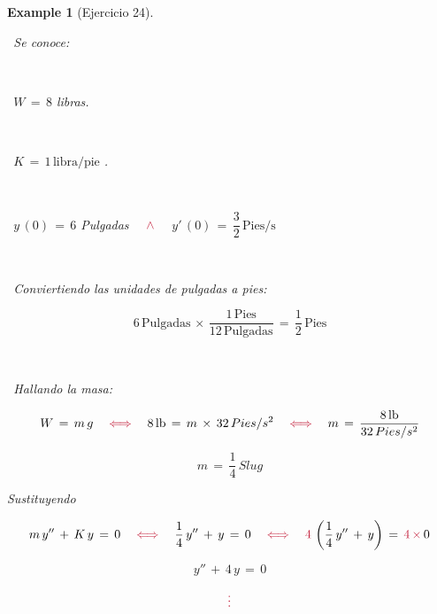 \documentclass[a4paper,11pt,openany]{book}
\newtheorem{exmp}{Example}[section]
\begin{document}
\begin{exmp}[Ejercicio 24]
 
 
\ 
 
\textcolor{cardinal}{}\, Se conoce: 
 
\ 
 
\textcolor{cardinal}{}\, $W\,=\,8$ libras.
 
\ 
 
\textcolor{cardinal}{}\, $K\,=\,1\,\text{libra/pie}$ .
 
\ 
 
\textcolor{cardinal}{}\, $y\,(0)\,=\,6$ Pulgadas $\quad \textcolor{cardinal}{\wedge} \quad$ $y'\,(0)\,=\,\dfrac{3}{2}\,\text{Pies/s}$
 
\ 
 
\textcolor{cardinal}{}\, Conviertiendo las unidades de pulgadas a pies: 
 
$$6\,\text{Pulgadas}\,\times\,\dfrac{1\,\text{Pies}}{12\,\text{Pulgadas}}\,=\,\dfrac{1}{2}\,\text{Pies}$$
 
\ 
 
\textcolor{cardinal}{}\, Hallando la masa: 
 
$$W\,=\,m\,g \quad \textcolor{cardinal}{\iff} \quad 8\,\text{lb}\,=\,m\,\times\,32\,Pies/s^{2} \quad \textcolor{cardinal}{\iff} \quad m\,=\,\dfrac{8\,\text{lb}}{32\,Pies/s^{2} }$$
 
$$\boxed{m\,=\,\dfrac{1}{4}\,Slug }$$
 
Sustituyendo
 
$$m\,y''\,+\,K\,y\,=\,0 \quad \textcolor{cardinal}{\iff} \quad \dfrac{1}{4}\,y''\,+\,y\,=\,0 \quad \textcolor{cardinal}{\iff} \quad \textcolor{cardinal}{4}\,\left(\dfrac{1}{4}\,y''\,+\,y \right)\,=\,\textcolor{cardinal}{4\,\times}\,0$$
 
$$y''\,+\,4\,y\,=\,0$$
 
$$\textcolor{cardinal}{\vdots}$$
 
\end{exmp}
 
\end{document}
